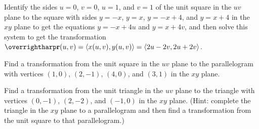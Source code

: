 \documentclass[letterpaper, twoside, 12pt]{book}
\begin{document}
          \begin{problem}
            Identify the sides $u=0$, $v=0$, $u=1$, and $v=1$
            of the unit square in the $uv$ plane
            to the square with sides $y=-x$, $y=x$, $y=-x+4$,
            and $y=x+4$ in the $xy$ plane to get the equations
            $y=-x+4u$ and $y=x+4v$, and then
            solve this system to get the transformation
            $\vect{r}(u,v)=\<x(u,v),y(u,v)\>=\<2u-2v,2u+2v\>$.
          \end{problem}

          \begin{solution}

          \end{solution}

          \begin{contributors}

          \end{contributors}

          \begin{problem}
            Find a transformation from the unit square in the $uv$ plane
            to the parallelogram with vertices $(1,0)$, $(2,-1)$,
            $(4,0)$, and $(3,1)$ in the $xy$ plane.
          \end{problem}

          \begin{solution}

          \end{solution}

          \begin{contributors}

          \end{contributors}

          \begin{problem}
            Find a transformation from the unit triangle in the $uv$ plane
            to the triangle with vertices $(0,-1)$, $(2,-2)$,
            and $(-1,0)$ in the $xy$ plane. (Hint: complete the triangle
            in the $xy$ plane to a parallelogram and then find a transformation
            from the unit square to that parallelogram.)
          \end{problem}

          \begin{solution}

          \end{solution}

          \begin{contributors}

          \end{contributors}
\end{document}
